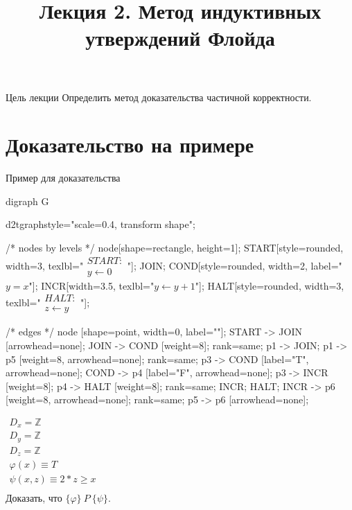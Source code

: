 \documentclass[hyperref={unicode=true}]{beamer}
\title{Лекция 2. Метод индуктивных утверждений Флойда}
\author{}
\date{}
\begin{document}
	\begin{frame}{}
		\titlepage
	\end{frame}

    \begin{frame}{Цель лекции}
    Определить метод доказательства частичной корректности.
    \end{frame}

    \section{Доказательство на примере}

	\begin{frame}[fragile]{Пример для доказательства}
	\setlength{\columnsep}{4cm}
	
	\begin{multicols}{2}
	
	\huge
	\begin{dot2tex}[options=-traw]
	digraph G{
		d2tgraphstyle="scale=0.4, transform shape";
		
		/* nodes by levels */
		node[shape=rectangle, height=1];
		START[style=rounded, width=3, texlbl="$\begin{matrix}START:\\ y \leftarrow 0\end{matrix}$"];
		JOIN;
        COND[style=rounded, width=2, label="$y = x$"];
		INCR[width=3.5, texlbl="$y \leftarrow y + 1$"];
        HALT[style=rounded, width=3, texlbl="$\begin{matrix}HALT:\\  z \leftarrow y\end{matrix}$"];
				
		/* edges */
		node [shape=point, width=0, label=""];
		START -> JOIN [arrowhead=none]; JOIN -> COND [weight=8];
		{ rank=same; p1 -> JOIN; }
		p1 -> p5 [weight=8, arrowhead=none];
		{ rank=same; p3 -> COND [label="T", arrowhead=none]; COND -> p4 [label="F", arrowhead=none]; }
		p3 -> INCR [weight=8];
		p4 -> HALT [weight=8];
		{ rank=same; INCR; HALT; }
		INCR -> p6 [weight=8, arrowhead=none];
		{ rank=same; p5 -> p6 [arrowhead=none]; }
	}
	\end{dot2tex}
	
	\large
	
    $\begin{matrix}
    D_x = \mathbb{Z}\\
    D_y = \mathbb{Z}\\
    D_z = \mathbb{Z}\\
    \varphi(x) \equiv T\\
    \psi(x, z) \equiv 2 * z \geq x\\
    \end{matrix}$\\

    Доказать, что $\{\varphi\}~P~\{\psi\}$.
	\end{multicols}

	\end{frame}
    
\end{document}
